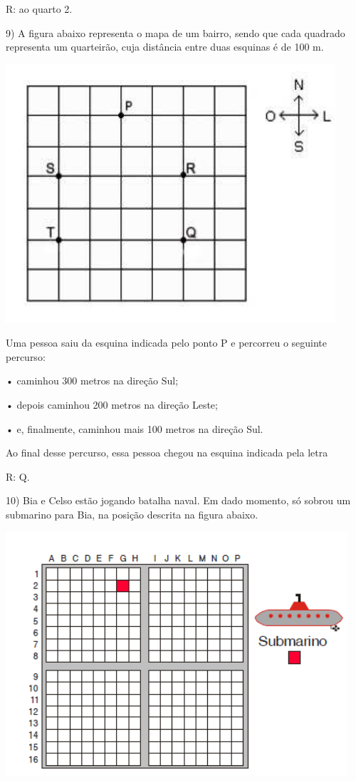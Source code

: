 R: ao quarto 2.

9) A figura abaixo representa o mapa de um bairro, sendo que cada
quadrado representa um quarteirão, cuja distância entre duas esquinas é
de 100 m.

\includegraphics[width=4.82569in,height=3.77917in]{./imgSAEB_6_MAT/media/image72.png}

Uma pessoa saiu da esquina indicada pelo ponto P e percorreu o seguinte
percurso:

• caminhou 300 metros na direção Sul;

• depois caminhou 200 metros na direção Leste;

• e, finalmente, caminhou mais 100 metros na direção Sul.

Ao final desse percurso, essa pessoa chegou na esquina indicada pela
letra

R: Q.

10) Bia e Celso estão jogando batalha naval. Em dado momento, só sobrou
um submarino para Bia, na posição descrita na figura abaixo.

\includegraphics[width=5in,height=3.55208in]{./imgSAEB_6_MAT/media/image73.png}

